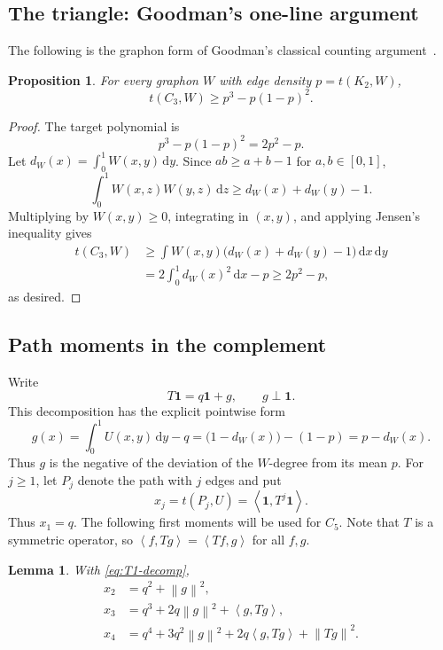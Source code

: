\documentclass[11pt]{article}
\newtheorem{proposition}[theorem]{Proposition}
\newtheorem{lemma}[theorem]{Lemma}
\numberwithin{equation}{section}
\newcommand{\one}{\mathbf 1}
\newcommand{\ip}[2]{\left\langle #1,#2\right\rangle}
\newcommand{\norm}[1]{\left\lVert #1\right\rVert}
\newcommand{\dd}{\,\mathrm d}
\begin{document}
\subsection{The triangle: Goodman's one-line argument}\label{subsec:C3}

The following is the graphon form of Goodman's classical counting argument~\cite{Goodman1959}.

\begin{proposition}\label{prop:C3}
  For every graphon $W$ with edge density $p=t(K_2,W)$,
  \[
    t(C_3,W)\ge p^3-p(1-p)^2.
  \]
\end{proposition}

\begin{proof}
  The target polynomial is
  \[
    p^3-p(1-p)^2=2p^2-p.
  \]
  Let $d_W(x)=\int_0^1W(x,y)\dd y$.
  Since $ab\ge a+b-1$ for $a,b\in[0,1]$,
  \[
    \int_0^1W(x,z)W(y,z)\dd z\ge d_W(x)+d_W(y)-1.
  \]
  Multiplying by $W(x,y)\ge0$, integrating in $(x,y)$, and applying Jensen's inequality gives
  \begin{align*}
    t(C_3,W)
    &\ge \int W(x,y)\bigl(d_W(x)+d_W(y)-1\bigr)\dd x\dd y\\
    &=2\int_0^1d_W(x)^2\dd x-p
    \ge2p^2-p,
  \end{align*}
  as desired.
\end{proof}

\subsection{Path moments in the complement}\label{subsec:path-moments}

Write
\begin{equation}\label{eq:T1-decomp}
  T\one=q\one+g,
  \qquad g\perp\one.
\end{equation}
This decomposition has the explicit pointwise form
\[
  g(x)=\int_0^1U(x,y)\dd y-q
  =\bigl(1-d_W(x)\bigr)-(1-p)
  =p-d_W(x).
\]
Thus $g$ is the negative of the deviation of the $W$-degree from its mean $p$.
For $j\ge1$, let $P_j$ denote the path with $j$ edges and put
\[
  x_j=t(P_j,U)=\ip{\one}{T^j\one}.
\]
Thus $x_1=q$.
The following first moments will be used for $C_5$.
Note that $T$ is a symmetric operator, so $\ip{f}{Tg}=\ip{Tf}{g}$ for all $f,g$.

\begin{lemma}\label{lem:path-to-4}
  With \eqref{eq:T1-decomp},
  \begin{align*}
    x_2&=q^2+\norm g^2,\\
    x_3&=q^3+2q\norm g^2+\ip g{Tg},\\
    x_4&=q^4+3q^2\norm g^2+2q\ip g{Tg}+\norm{Tg}^2.
  \end{align*}
\end{lemma}
\end{document}
